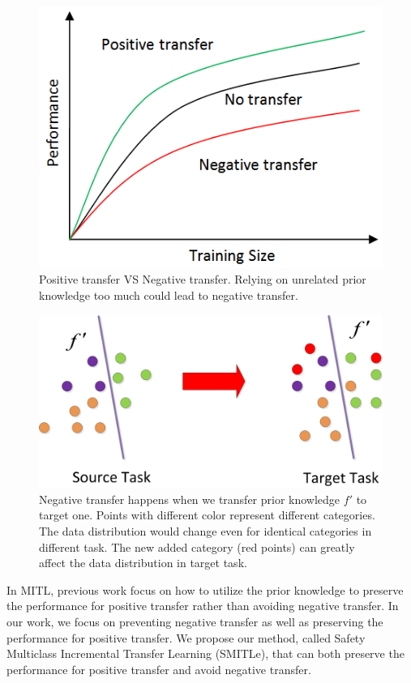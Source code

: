\begin{figure}
\centering
\includegraphics[scale=.5]{fig/negative.png}
\caption{Positive transfer VS Negative transfer. Relying on unrelated prior knowledge too much could lead to negative transfer.}\label{fig:neg}
\end{figure}
\begin{figure}
\centering
\includegraphics[scale=.4]{fig/domain.jpg}
\caption{Negative transfer happens when we transfer prior knowledge $f'$ to target one. Points with different color represent different categories. The data distribution would change even for identical categories in different task. The new added category (red points) can greatly affect the data distribution in target task. }\label{fig:distribution}
\end{figure}
In MITL, previous work focus on how to utilize the prior knowledge to preserve the performance for positive transfer rather than avoiding negative transfer. In our work, we focus on preventing negative transfer as well as preserving the performance for positive transfer. We propose our method, called Safety Multiclass Incremental Transfer Learning (SMITLe), that can both preserve the performance for positive transfer and avoid negative transfer. 
